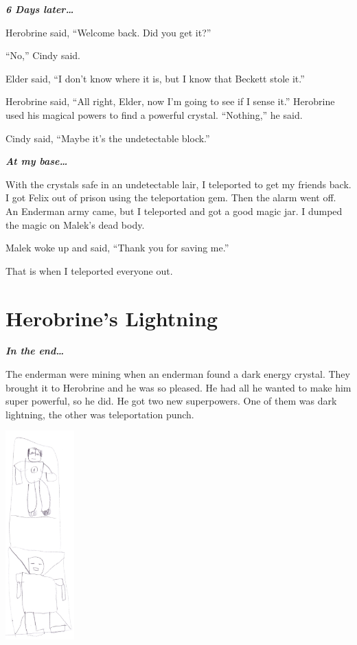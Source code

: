 \documentclass[booklet, twoside, 12pt]{krantz}
\begin{document}
\textbf{\emph{6 Days later\ldots{}}}

Herobrine said, ``Welcome back. Did you get it?''

``No,'' Cindy said.

Elder said, ``I don't know where it is, but I know that Beckett stole
it.''

Herobrine said, ``All right, Elder, now I'm going to see if I sense
it.'' Herobrine used his magical powers to find a powerful crystal.
``Nothing,'' he said.

Cindy said, ``Maybe it's the undetectable block.''

\textbf{\emph{At my base\ldots{}}}

With the crystals safe in an undetectable lair, I teleported to get my
friends back. I got Felix out of prison using the teleportation gem.
Then the alarm went off. An Enderman army came, but I teleported and got
a good magic jar. I dumped the magic on Malek's dead body.

Malek woke up and said, ``Thank you for saving me.''

That is when I teleported everyone out.

\hypertarget{herobrines-lightning}{%
\section{Herobrine's Lightning}\label{herobrines-lightning}}

\textbf{\emph{In the end\ldots{}}}

The enderman were mining when an enderman found a dark energy crystal.
They brought it to Herobrine and he was so pleased. He had all he wanted
to make him super powerful, so he did. He got two new superpowers. One
of them was dark lightning, the other was teleportation punch.

\includegraphics[width=1.04167in,height=\textheight]{img/final-war/dark-lightning.jpg}
\end{document}
